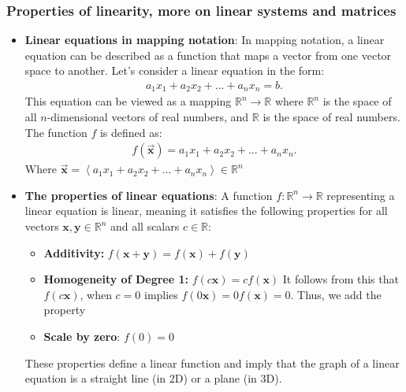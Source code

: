 \documentclass{report}
\begin{document}
    \subsubsection{Properties of linearity, more on linear systems and matrices}
    \begin{itemize}
                \item \textbf{Linear equations in mapping notation}:
            In mapping notation, a linear equation can be described as a function that maps a vector from one vector space to another. Let's consider a linear equation in the form:
            \begin{align*}
                a_{1}x_{1} + a_{2}x_{2} + ... + a_{n}x_{n} = b
            .\end{align*}
            \bigbreak \noindent 
            This equation can be viewed as a mapping $\mathbb{R}^{n} \to \mathbb{R}$ where $\mathbb{R}^{n}$ is the space of all $n$-dimensional vectors of real numbers, and $\mathbb{R}$ is the space of real numbers. The function $f$ is defined as:
            \begin{align*}
                f(\vec{\mathbf{x}}) =  a_{1}x_{1} + a_{2}x_{2} + ... + a_{n}x_{n}
            .\end{align*}
             Where $\vec{\mathbf{x}} = \left\langle a_{1}x_{1} + a_{2}x_{2} + ... + a_{n}x_{n} \right\rangle \in \mathbb{R}^{n}$
         \item \textbf{The properties of linear equations}:
             A function \( f: \mathbb{R}^n \rightarrow \mathbb{R} \) representing a linear equation is linear, meaning it satisfies the following properties for all vectors \( \mathbf{x}, \mathbf{y} \in \mathbb{R}^n \) and all scalars \( c \in \mathbb{R} \):
             \begin{itemize}
                 \item \textbf{Additivity:} \( f(\mathbf{x} + \mathbf{y}) = f(\mathbf{x}) + f(\mathbf{y}) \)
                 \item \textbf{Homogeneity of Degree 1:} \( f(c\mathbf{x}) = cf(\mathbf{x}) \)
                     \bigbreak \noindent 
                     It follows from this that $f(c\mathbf{x})$, when $c=0$ implies $f(0 \mathbf{x}) = 0 f(\mathbf{x}) = 0$. Thus, we add the property
                    \item \textbf{Scale by zero}: $f(0) = 0$
             \end{itemize}
             These properties define a linear function and imply that the graph of a linear equation is a straight line (in 2D) or a plane (in 3D).

\end{itemize}
\end{document}
